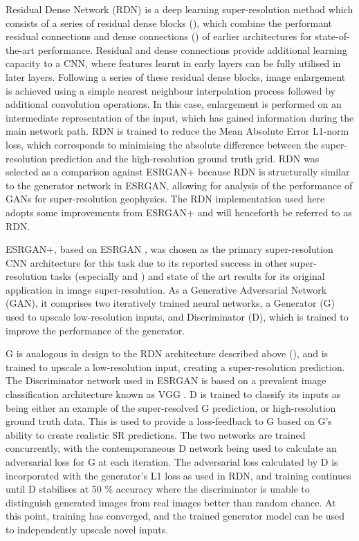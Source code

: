 \documentclass[manuscript.tex]{subfiles}
\begin{document}
Residual Dense Network (RDN) \parencite{zhangResidualDenseNetwork2018} is a deep learning super-resolution method which consists of a series of residual dense blocks (), which combine the performant residual connections and dense connections () of earlier architectures for state-of-the-art performance.
Residual and dense connections provide additional learning capacity to a CNN, where features learnt in early layers can be fully utilised in later layers.
Following a series of these residual dense blocks, image enlargement is achieved using a simple nearest neighbour interpolation process followed by additional convolution operations.
In this case, enlargement is performed on an intermediate representation of the input, which has gained information during the main network path.
RDN is trained to reduce the Mean Absolute Error L1-norm loss, which corresponds to minimising the absolute difference between the super-resolution prediction and the high-resolution ground truth grid.
RDN was selected as a comparison against ESRGAN+ because RDN is structurally similar to the generator network in ESRGAN, allowing for analysis of the performance of GANs for super-resolution geophysics.
The RDN implementation used here adopts some improvements from ESRGAN+ and will henceforth be referred to as RDN\textdaggerdbl{}.

ESRGAN+, based on ESRGAN \parencite{wangESRGANEnhancedSuperresolution2018}, was chosen as the primary super-resolution CNN architecture for this task due to its reported success in other super-resolution tasks (especially \cite{bodeUsingPhysicsInformedSuperResolution2019} and \cite{leongDeepBedMapDeepNeural2020}) and state of the art results for its original application in image super-resolution.
As a Generative Adversarial Network (GAN), it comprises two iteratively trained neural networks, a Generator (G) used to upscale low-resolution inputs, and Discriminator (D), which is trained to improve the performance of the generator.

G is analogous in design to the RDN architecture described above (), and is trained to upscale a low-resolution input, creating a super-resolution prediction.
The Discriminator network used in ESRGAN is based on a prevalent image classification architecture known as VGG \parencite{simonyanVeryDeepConvolutional2015}.
D is trained to classify its inputs as being either an example of the super-resolved G prediction, or high-resolution ground truth data.
This is used to provide a loss-feedback to G based on G's ability to create realistic SR predictions.
The two networks are trained concurrently, with the contemporaneous D network being used to calculate an adversarial loss for G at each iteration.
The adversarial loss calculated by D is incorporated with the generator's L1 loss as used in RDN, and training continues until D stabilises at 50 \% accuracy where the discriminator is unable to distinguish generated images from real images better than random chance.
At this point, training has converged, and the trained generator model can be used to independently upscale novel inputs.
\end{document}
